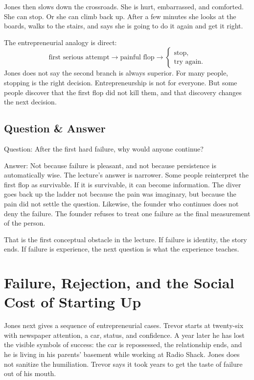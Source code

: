 Jones then slows down the crossroads. She is hurt, embarrassed, and comforted. She can stop. Or she can climb back up. After a few minutes she looks at the boards, walks to the stairs, and says she is going to do it again and get it right.

The entrepreneurial analogy is direct:
\begin{equation}
\text{first serious attempt}
\longrightarrow
\text{painful flop}
\longrightarrow
\begin{cases}
\text{stop},\\
\text{try again}.
\end{cases}
\end{equation}
Jones does not say the second branch is always superior. For many people, stopping is the right decision. Entrepreneurship is not for everyone. But some people discover that the first flop did not kill them, and that discovery changes the next decision.

\subsection{Question \& Answer}

Question: After the first hard failure, why would anyone continue?

Answer: Not because failure is pleasant, and not because persistence is automatically wise. The lecture's answer is narrower. Some people reinterpret the first flop as survivable. If it is survivable, it can become information. The diver goes back up the ladder not because the pain was imaginary, but because the pain did not settle the question. Likewise, the founder who continues does not deny the failure. The founder refuses to treat one failure as the final measurement of the person.

That is the first conceptual obstacle in the lecture. If failure is identity, the story ends. If failure is experience, the next question is what the experience teaches.

\section{Failure, Rejection, and the Social Cost of Starting Up}

Jones next gives a sequence of entrepreneurial cases. Trevor starts at twenty-six with newspaper attention, a car, status, and confidence. A year later he has lost the visible symbols of success: the car is repossessed, the relationship ends, and he is living in his parents' basement while working at Radio Shack. Jones does not sanitize the humiliation. Trevor says it took years to get the taste of failure out of his mouth.


